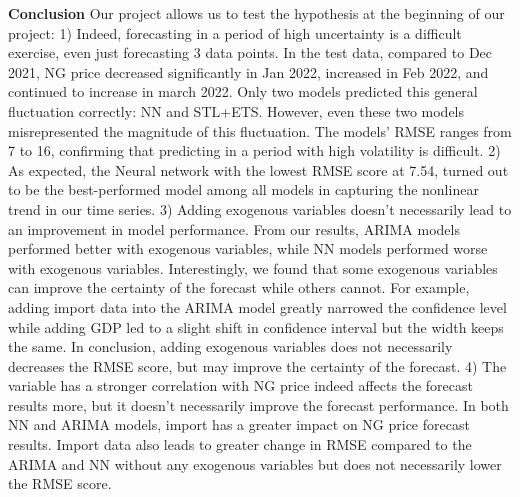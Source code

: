 \documentclass[
]{article}
\begin{document}
\textbf{Conclusion} Our project allows us to test the hypothesis at the
beginning of our project: 1) Indeed, forecasting in a period of high
uncertainty is a difficult exercise, even just forecasting 3 data
points. In the test data, compared to Dec 2021, NG price decreased
significantly in Jan 2022, increased in Feb 2022, and continued to
increase in march 2022. Only two models predicted this general
fluctuation correctly: NN and STL+ETS. However, even these two models
misrepresented the magnitude of this fluctuation. The models' RMSE
ranges from 7 to 16, confirming that predicting in a period with high
volatility is difficult. 2) As expected, the Neural network with the
lowest RMSE score at 7.54, turned out to be the best-performed model
among all models in capturing the nonlinear trend in our time series. 3)
Adding exogenous variables doesn't necessarily lead to an improvement in
model performance. From our results, ARIMA models performed better with
exogenous variables, while NN models performed worse with exogenous
variables. Interestingly, we found that some exogenous variables can
improve the certainty of the forecast while others cannot. For example,
adding import data into the ARIMA model greatly narrowed the confidence
level while adding GDP led to a slight shift in confidence interval but
the width keeps the same. In conclusion, adding exogenous variables does
not necessarily decreases the RMSE score, but may improve the certainty
of the forecast. 4) The variable has a stronger correlation with NG
price indeed affects the forecast results more, but it doesn't
necessarily improve the forecast performance. In both NN and ARIMA
models, import has a greater impact on NG price forecast results. Import
data also leads to greater change in RMSE compared to the ARIMA and NN
without any exogenous variables but does not necessarily lower the RMSE
score.
\end{document}
